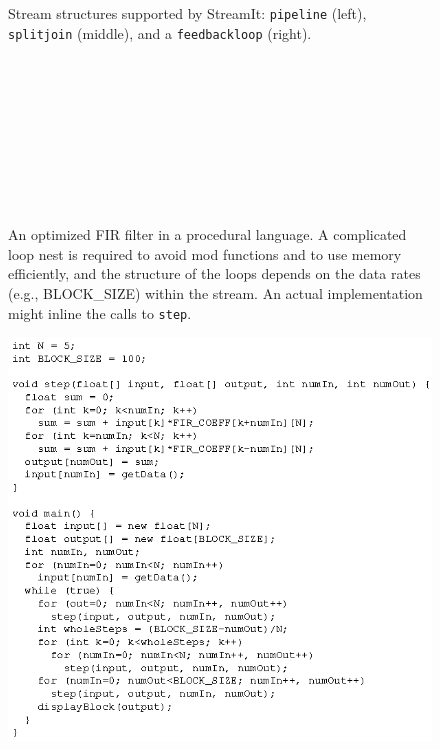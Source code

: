 \documentclass[final]{ijpp}
\begin{document}
\clearpage
\begin{figure}
  \caption{Stream structures supported by StreamIt: \texttt{pipeline} (left),
  \texttt{splitjoin} (middle), and a \texttt{feedbackloop} (right).}
  \label{fig:structuresp}
\end{figure}
\clearpage
\begin{figure}
  \begin{minipage}{0.46in}
  \centering
   \\
  \end{minipage} 
  ~
  \begin{minipage}{1.3in}
  \centering
   \\
  \end{minipage}
  ~
  \begin{minipage}{1.02in}
  \centering
   \\
  \end{minipage} 
\end{figure}

\clearpage
\begin{figure}
  \caption{An optimized FIR filter in a procedural language.  A
  complicated loop nest is required to avoid mod functions and to use
  memory efficiently, and the structure of the loops depends on the
  data rates (e.g., BLOCK\_SIZE) within the stream.  An actual
  implementation might inline the calls to \texttt{step}.}
  \label{fig:firprocedural}
\end{figure}
\clearpage
\begin{figure}
  \includegraphics{fir-proc.eps}
\end{figure}
\end{document}
